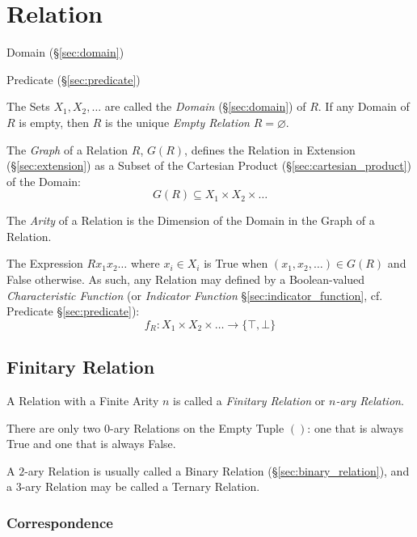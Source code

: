 \section{Relation}\label{sec:set_relation}

Domain (\S\ref{sec:domain})

Predicate (\S\ref{sec:predicate})

The Sets $X_1, X_2, \ldots$ are called the \emph{Domain}
(\S\ref{sec:domain}) of $R$. If any Domain of $R$ is empty, then $R$
is the unique \emph{Empty Relation} $R = \varnothing$.

The \emph{Graph} of a Relation $R$, $G(R)$, defines the Relation in
Extension (\S\ref{sec:extension}) as a Subset of the Cartesian Product
(\S\ref{sec:cartesian_product}) of the Domain:
\[
  G(R) \subseteq X_1 \times X_2 \times \ldots
\]

The \emph{Arity} of a Relation is the Dimension of the Domain in the
Graph of a Relation. %

The Expression $R x_1 x_2 \ldots$ where $x_i \in X_i$ is True when
$(x_1, x_2, \ldots) \in G(R)$ and False otherwise. As such, any
Relation may defined by a Boolean-valued \emph{Characteristic
  Function} (or \emph{Indicator Function}
\S\ref{sec:indicator_function}, cf. Predicate \S\ref{sec:predicate}):
\[
  f_R : X_1 \times X_2 \times \ldots \rightarrow \{\top,\bot\}
\]


\subsection{Finitary Relation}\label{sec:finitary_relation}

A Relation with a Finite Arity $n$ is called a \emph{Finitary
  Relation} or \emph{$n$-ary Relation}.

There are only two $0$-ary Relations on the Empty Tuple $()$: one that
is always True and one that is always False.

A $2$-ary Relation is usually called a Binary Relation
(\S\ref{sec:binary_relation}), and a $3$-ary Relation may be called a
Ternary Relation.



\subsubsection{Correspondence}\label{sec:correspondence}

